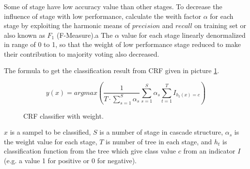 Some of stage have low accuracy value than other stages.
To decrease the influence of stage with low performance, calculate the weith
factor $\alpha$ for each stage by exploiting the harmonic means of $precision$
and $recall$ on training set or also known as $F_1$ (F-Measure).a
The $\alpha$ value for each stage linearly denormalized in range of 0 to 1, so
that the weight of low performance stage reduced to make their contribution to
majority voting also decreased.

The formula to get the classification result from CRF given in picture
\ref{form:crf}.

\begin{figure}[h]
\[
	y(x) = argmax \left(
			\frac{1}{T \cdot \sum^{S}_{s=1} \alpha_{s} }
			\sum\limits_{s=1}^{S} \alpha_{s}
			\sum\limits^{T}_{t=1} I_{h_{t} (x) = c}
		\right)
\]
\caption{CRF classifier with weight.}
\label{form:crf}
\end{figure}

$x$ is a sampel to be classified,
$S$ is a number of stage in cascade structure,
$\alpha_{s}$ is the weight value for each stage,
$T$ is number of tree in each stage, and
$h_{t}$ is classification function from the tree which give class value $c$
from an indicator $I$ (e.g. a value 1 for positive or 0 for negative).

